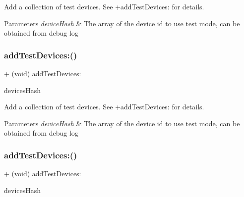 Add a collection of test devices. See {\ttfamily +add\+Test\+Devices\+:} for details.


\begin{DoxyParams}{Parameters}
{\em device\+Hash} & The array of the device id to use test mode, can be obtained from debug log \\
\hline
\end{DoxyParams}
\mbox{\label{interfaceFBAdSettings_aef0e9decab562f63ecadc72dbb594a56}} 
\subsubsection{\texorpdfstring{add\+Test\+Devices\+:()}{addTestDevices:()}\hspace{0.1cm}{\footnotesize\ttfamily [3/5]}}
{\footnotesize\ttfamily + (void) add\+Test\+Devices\+: \begin{DoxyParamCaption}\item[{(N\+S\+Array $\ast$)}]{devices\+Hash }\end{DoxyParamCaption}}

Add a collection of test devices. See {\ttfamily +add\+Test\+Devices\+:} for details.


\begin{DoxyParams}{Parameters}
{\em device\+Hash} & The array of the device id to use test mode, can be obtained from debug log \\
\hline
\end{DoxyParams}
\mbox{\label{interfaceFBAdSettings_aef0e9decab562f63ecadc72dbb594a56}} 
\subsubsection{\texorpdfstring{add\+Test\+Devices\+:()}{addTestDevices:()}\hspace{0.1cm}{\footnotesize\ttfamily [4/5]}}
{\footnotesize\ttfamily + (void) add\+Test\+Devices\+: \begin{DoxyParamCaption}\item[{(N\+S\+Array $\ast$)}]{devices\+Hash }\end{DoxyParamCaption}}

